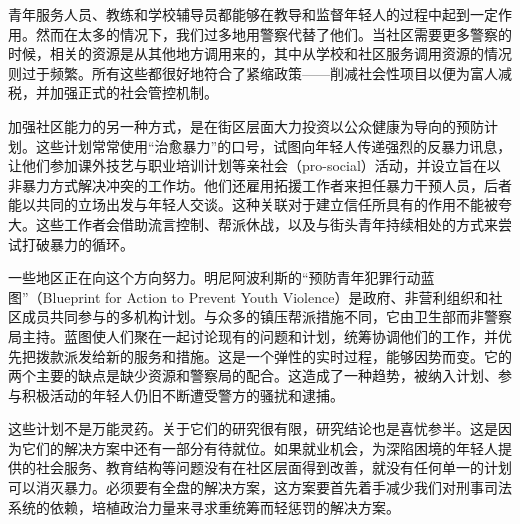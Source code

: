 \documentclass[fontset=fandol, a4paper, 12pt, openright]{ctexbook}
\begin{document}
青年服务人员、教练和学校辅导员都能够在教导和监督年轻人的过程中起到一定作用。然而在太多的情况下，我们过多地用警察代替了他们。当社区需要更多警察的时候，相关的资源是从其他地方调用来的，其中从学校和社区服务调用资源的情况则过于频繁。所有这些都很好地符合了紧缩政策——削减社会性项目以便为富人减税，并加强正式的社会管控机制。

加强社区能力的另一种方式，是在街区层面大力投资以公众健康为导向的预防计划。这些计划常常使用“治愈暴力”的口号，试图向年轻人传递强烈的反暴力讯息，让他们参加课外技艺与职业培训计划等亲社会（pro-social）活动，并设立旨在以非暴力方式解决冲突的工作坊。他们还雇用拓援工作者来担任暴力干预人员，后者能以共同的立场出发与年轻人交谈。这种关联对于建立信任所具有的作用不能被夸大。这些工作者会借助流言控制、帮派休战，以及与街头青年持续相处的方式来尝试打破暴力的循环。

一些地区正在向这个方向努力。明尼阿波利斯的“预防青年犯罪行动蓝图”（Blueprint for Action to Prevent Youth Violence）是政府、非营利组织和社区成员共同参与的多机构计划。与众多的镇压帮派措施不同，它由卫生部而非警察局主持。蓝图使人们聚在一起讨论现有的问题和计划，统筹协调他们的工作，并优先把拨款派发给新的服务和措施。这是一个弹性的实时过程，能够因势而变。它的两个主要的缺点是缺少资源和警察局的配合。这造成了一种趋势，被纳入计划、参与积极活动的年轻人仍旧不断遭受警方的骚扰和逮捕。

这些计划不是万能灵药。关于它们的研究很有限，研究结论也是喜忧参半。这是因为它们的解决方案中还有一部分有待就位。如果就业机会，为深陷困境的年轻人提供的社会服务、教育结构等问题没有在社区层面得到改善，就没有任何单一的计划可以消灭暴力。必须要有全盘的解决方案，这方案要首先着手减少我们对刑事司法系统的依赖，培植政治力量来寻求重统筹而轻惩罚的解决方案。
\end{document}
